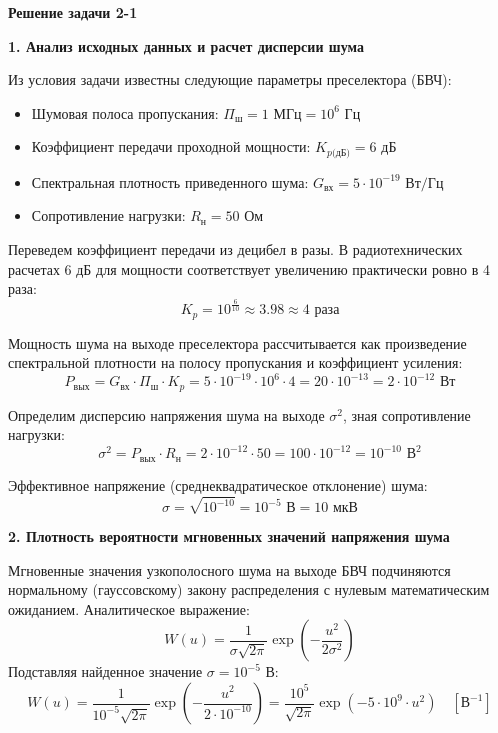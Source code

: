 \textbf{Решение задачи 2-1}

\vspace{1em}
\textbf{1. Анализ исходных данных и расчет дисперсии шума}

Из условия задачи известны следующие параметры преселектора (БВЧ):
\begin{itemize}
    \item Шумовая полоса пропускания: $\Pi_{\text{ш}} = 1 \text{ МГц} = 10^6 \text{ Гц}$
    \item Коэффициент передачи проходной мощности: $K_{p\text{(дБ)}} = 6 \text{ дБ}$
    \item Спектральная плотность приведенного шума: $G_{\text{вх}} = 5 \cdot 10^{-19} \text{ Вт/Гц}$
    \item Сопротивление нагрузки: $R_{\text{н}} = 50 \text{ Ом}$
\end{itemize}

Переведем коэффициент передачи из децибел в разы. В радиотехнических расчетах $6 \text{ дБ}$ для мощности соответствует увеличению практически ровно в 4 раза:
\begin{equation*}
    K_p = 10^{\frac{6}{10}} \approx 3.98 \approx 4 \text{ раза}
\end{equation*}

Мощность шума на выходе преселектора рассчитывается как произведение спектральной плотности на полосу пропускания и коэффициент усиления:
\begin{equation*}
    P_{\text{вых}} = G_{\text{вх}} \cdot \Pi_{\text{ш}} \cdot K_p = 5 \cdot 10^{-19} \cdot 10^6 \cdot 4 = 20 \cdot 10^{-13} = 2 \cdot 10^{-12} \text{ Вт}
\end{equation*}

Определим дисперсию напряжения шума на выходе $\sigma^2$, зная сопротивление нагрузки:
\begin{equation*}
    \sigma^2 = P_{\text{вых}} \cdot R_{\text{н}} = 2 \cdot 10^{-12} \cdot 50 = 100 \cdot 10^{-12} = 10^{-10} \text{ В}^2
\end{equation*}

Эффективное напряжение (среднеквадратическое отклонение) шума:
\begin{equation*}
    \sigma = \sqrt{10^{-10}} = 10^{-5} \text{ В} = 10 \text{ мкВ}
\end{equation*}

\vspace{1em}
\textbf{2. Плотность вероятности мгновенных значений напряжения шума}

Мгновенные значения узкополосного шума на выходе БВЧ подчиняются нормальному (гауссовскому) закону распределения с нулевым математическим ожиданием. Аналитическое выражение:
\begin{equation*}
    W(u) = \frac{1}{\sigma \sqrt{2\pi}} \exp\left(-\frac{u^2}{2\sigma^2}\right)
\end{equation*}
Подставляя найденное значение $\sigma = 10^{-5} \text{ В}$:
\begin{equation*}
    W(u) = \frac{1}{10^{-5} \sqrt{2\pi}} \exp\left(-\frac{u^2}{2 \cdot 10^{-10}}\right) = \frac{10^5}{\sqrt{2\pi}} \exp\left(-5 \cdot 10^9 \cdot u^2\right) \quad [\text{В}^{-1}]
\end{equation*}

